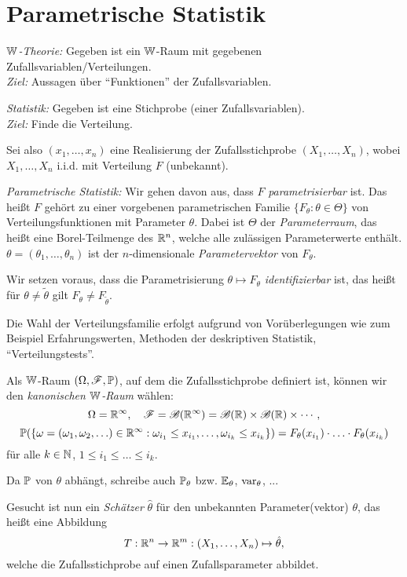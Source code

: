 \chapter{Parametrische Statistik}
\emph{$\mathbb{W}$-Theorie:} Gegeben ist ein $\mathbb{W}$-Raum mit gegebenen
Zufallsvariablen/Verteilungen. \\
\emph{Ziel:} Aussagen über ``Funktionen'' der Zufallsvariablen.

\emph{Statistik:} Gegeben ist eine Stichprobe (einer Zufallsvariablen). \\
\emph{Ziel:} Finde die Verteilung.

Sei also $(x_1, \ldots, x_n)$ eine Realisierung der Zufallsstichprobe $(X_1,
\ldots, X_n)$, wobei $X_1, \ldots, X_n$ i.i.d. mit Verteilung $F$ (unbekannt).

\emph{Parametrische Statistik:} Wir gehen davon aus, dass $F$
\emph{parametrisierbar} ist. Das heißt $F$ gehört zu einer vorgebenen
parametrischen Familie $\{ F_\theta : \theta \in \Theta \}$ von
Verteilungsfunktionen mit Parameter $\theta$. Dabei ist $\Theta$ der
\emph{Parameterraum}, das heißt eine Borel-Teilmenge des $\mathbb{R}^n$, welche alle
zulässigen Parameterwerte enthält. $\theta = (\theta_1, \ldots, \theta_n)$ ist
der $n$-dimensionale \emph{Parametervektor} von $F_\theta$.

Wir setzen voraus, dass die Parametrisierung $\theta \mapsto F_\theta$
\emph{identifizierbar} ist, das heißt für $\theta \ne \tilde{\theta}$ gilt
$F_\theta \ne F_{\tilde{\theta}}$.

Die Wahl der Verteilungsfamilie erfolgt aufgrund von Vorüberlegungen wie zum
Beispiel Erfahrungswerten, Methoden der deskriptiven Statistik,
``Verteilungstests''.

Als $\mathbb{W}$-Raum $(\Omega, \mathscr{F}, \mathbb{P})$, auf dem die Zufallsstichprobe definiert ist,
können wir den \emph{kanonischen $\mathbb{W}$-Raum} wählen:
\[ \Omega = \mathbb{R}^\infty, \quad \mathscr{F} = \mathscr{B}( \mathbb{R}^\infty ) = \mathscr{B}(\mathbb{R})
  \times \mathscr{B}(\mathbb{R}) \times \cdots, \]
\[ \mathbb{P}( \{ \omega = (\omega_1, \omega_2, \ldots) \in \mathbb{R}^\infty: \omega_{i_1}
  \le x_{i_1}, \ldots, \omega_{i_k} \le x_{i_k}\} ) = F_\theta(x_{i_1}) \cdot
  \ldots \cdot F_\theta(x_{i_k}) \]
für alle $k \in \mathbb{N}$, $1 \le i_1 \le \ldots \le i_k$.

Da $\mathbb{P}$ von $\theta$ abhängt, schreibe auch $\mathbb{P}_\theta$ bzw. $\mathbb{E}_\theta$,
$\operatorname{var}_\theta$, ...

Gesucht ist nun ein \emph{Schätzer} $\hat{\theta}$ für den unbekannten
Parameter(vektor) $\theta$, das heißt eine Abbildung
\[ T: \mathbb{R}^n \to \mathbb{R}^m : (X_1, \ldots, X_n) \mapsto \hat{\theta}, \]
welche die Zufallsstichprobe auf einen Zufallsparameter abbildet.

